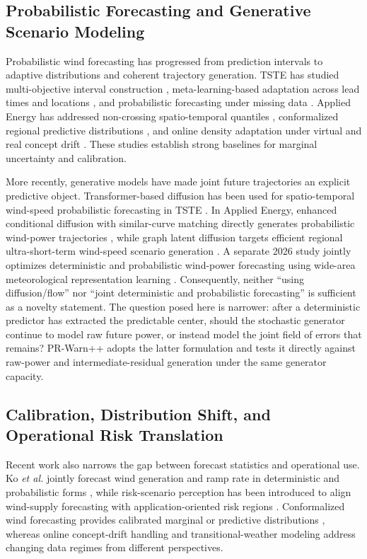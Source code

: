 \documentclass[journal]{IEEEtran}
\newcommand{\1}{\mathbb{I}}
\begin{document}
\subsection{Probabilistic Forecasting and Generative Scenario Modeling}
Probabilistic wind forecasting has progressed from prediction intervals to adaptive distributions and coherent trajectory generation. TSTE has studied multi-objective interval construction \cite{chen2024interval}, meta-learning-based adaptation across lead times and locations \cite{meng2024meta}, and probabilistic forecasting under missing data \cite{meng2026missing}. Applied Energy has addressed non-crossing spatio-temporal quantiles \cite{chen2025noncrossing}, conformalized regional predictive distributions \cite{jonkers2024conformal}, and online density adaptation under virtual and real concept drift \cite{he2025drift}. These studies establish strong baselines for marginal uncertainty and calibration.

More recently, generative models have made joint future trajectories an explicit predictive object. Transformer-based diffusion has been used for spatio-temporal wind-speed probabilistic forecasting in TSTE \cite{liu2026diffusion}. In Applied Energy, enhanced conditional diffusion with similar-curve matching directly generates probabilistic wind-power trajectories \cite{gao2026diffusion}, while graph latent diffusion targets efficient regional ultra-short-term wind-speed scenario generation \cite{ma2026stgld}. A separate 2026 study jointly optimizes deterministic and probabilistic wind-power forecasting using wide-area meteorological representation learning \cite{cao2026joint}. Consequently, neither ``using diffusion/flow'' nor ``joint deterministic and probabilistic forecasting'' is sufficient as a novelty statement. The question posed here is narrower: after a deterministic predictor has extracted the predictable center, should the stochastic generator continue to model raw future power, or instead model the joint field of errors that remains? PR-Warn++ adopts the latter formulation and tests it directly against raw-power and intermediate-residual generation under the same generator capacity.

\subsection{Calibration, Distribution Shift, and Operational Risk Translation}
Recent work also narrows the gap between forecast statistics and operational use. Ko \emph{et al.} jointly forecast wind generation and ramp rate in deterministic and probabilistic forms \cite{ko2026ramp}, while risk-scenario perception has been introduced to align wind-supply forecasting with application-oriented risk regions \cite{yang2025risk}. Conformalized wind forecasting provides calibrated marginal or predictive distributions \cite{jonkers2024conformal}, whereas online concept-drift handling \cite{he2025drift} and transitional-weather modeling \cite{zhang2026transitional} address changing data regimes from different perspectives.
\end{document}
